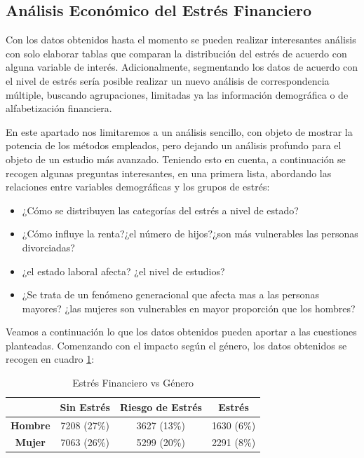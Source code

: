 \documentclass[a4paper, 11pt]{article}
\begin{document}
\subsection{Análisis Económico del Estrés Financiero}
Con los datos obtenidos hasta el momento se pueden realizar interesantes análisis con
solo elaborar tablas que comparan la distribución del estrés de acuerdo con alguna variable
de interés. Adicionalmente, segmentando los datos de acuerdo con el nivel de estrés sería 
posible realizar un nuevo análisis de correspondencia múltiple, buscando agrupaciones,
limitadas ya las información demográfica o de alfabetización financiera. 

En este apartado nos limitaremos a un análisis sencillo, con objeto de 
mostrar la potencia de los métodos empleados, pero dejando un análisis profundo
para el objeto de un estudio más avanzado. Teniendo esto en cuenta, a continuación
se recogen algunas preguntas interesantes, en una primera lista, abordando las
relaciones entre variables demográficas y los grupos de estrés:
\begin{itemize}
    \item ¿Cómo se distribuyen las categorías del estrés a nivel de estado?
    \item ¿Cómo influye la renta?¿el número de hijos?¿son más vulnerables las personas
    divorciadas?
    \item ¿el estado laboral afecta? ¿el nivel de estudios?
    \item ¿Se trata de un fenómeno generacional que afecta mas a las personas mayores? ¿las
    mujeres son vulnerables en mayor proporción que los hombres?
\end{itemize}

Veamos a continuación lo que los datos obtenidos pueden aportar a las cuestiones 
planteadas. Comenzando con el impacto según el género, los datos obtenidos se 
recogen en cuadro \ref{tab:stress_vs_gender}:

\begin{table}[ht]
\centering
\begin{tabular}{cccc }
\toprule
 & \textbf{Sin Estrés} & \textbf{Riesgo de Estrés} & \textbf{Estrés}\\
\midrule
\textbf{Hombre} & 7208 (27\%) & 3627 (13\%)& 1630 (6\%)\\
\textbf{Mujer} & 7063 (26\%)& 5299 (20\%)& 2291 (8\%)\\
\bottomrule
\end{tabular}
\caption{Estrés Financiero vs Género}
\label{tab:stress_vs_gender}
\end{table}
\end{document}
